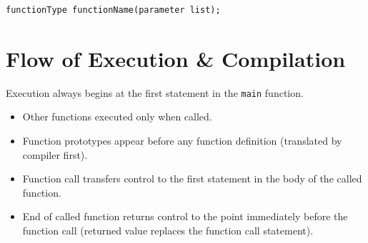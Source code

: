 \documentclass{article}
\begin{document}
\begin{lstlisting}[caption={Function Prototype Syntax}]
functionType functionName(parameter list); \end{lstlisting}

\section{Flow of Execution \& Compilation}
Execution always begins at the first statement in the \texttt{main} function.
\begin{itemize}
  \item Other functions executed only when called.
  \item Function prototypes appear before any function definition (translated by
    compiler first).
  \item Function call transfers control to the first statement in the body of
    the called function.
  \item End of called function returns control to the point immediately before
    the function call (returned value replaces the function call statement).
\end{itemize}

% 
%
\end{document}
